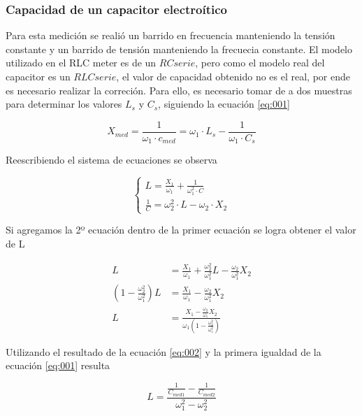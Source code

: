 \documentclass[a4paper,10pt]{article}
\begin{document}
		\subsubsection{Capacidad de un capacitor electro\'itico}	
		\indent Para esta medición se realió un barrido en frecuencia 
		manteniendo la tensión constante y un barrido de tensión manteniendo la
		frecuecia constante. El modelo utilizado en el RLC meter es de un $RC 
		serie$, pero como el modelo real del capacitor es un $RLC serie$, el 
		valor de capacidad obtenido no es el real, por ende es necesario 
		realizar la correción. Para ello, es necesario tomar de a dos muestras
		para determinar los valores $L_s$ y $C_s$, siguiendo la ecuación 
		\ref{eq:001}
		
		\begin{equation}\label{eq:001}
			X_{med} = \frac{1}{\omega_1\cdot c_{med}} = \omega_1\cdot L_s - 
			\frac{1}{\omega_1\cdot C_s}
		\end{equation}
		
		\indent Reescribiendo el sistema de ecuaciones se observa
		
		\[
		\begin{cases} 
			L = \frac{X_1}{\omega_1} + \frac{1}{\omega_1^2\cdot C} \\ 
			\frac{1}{C} = \omega_2^2\cdot L - \omega_2\cdot X_2
		\end{cases}
		\]
		
		\indent Si agregamos la 2º ecuación dentro de la primer ecuación 
		se logra obtener el valor de L

		\begin{align}\label{eq:002}
			L &= \frac{X_1}{\omega_1} + \frac{\omega_2^2}{\omega_1^2}L 
				- \frac{\omega_2}{\omega_1^2}X_2 \nonumber \\ 
			(1 - \frac{\omega_2^2}{\omega_1^2})L &= \frac{X_1}{\omega_1}
				- \frac{\omega_2}{\omega_1^2}X_2 \nonumber \\
			L &= \frac{X_1 - \frac{\omega_2}{\omega_1}X_2}
				{\omega_1(1 - \frac{\omega_2^2}{\omega_1^2})}
		\end{align}

		\indent Utilizando el resultado de la ecuación \ref{eq:002} y la primera
		igualdad de la ecuación \ref{eq:001} resulta

		\begin{equation}\label{eq:003}
			L = \frac{\frac{1}{C_{med1}} - \frac{1}{C_{med2}}}
					{\omega_1^2 - \omega_2^2}
		\end{equation}
\end{document}
